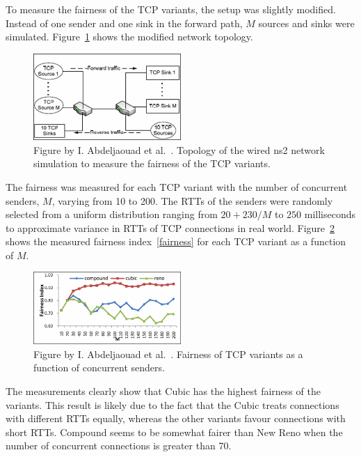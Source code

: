 To measure the fairness of the TCP variants, the setup was slightly modified. Instead of one sender and one sink in the forward path, $M$ sources and sinks were simulated. Figure~\ref{fig:topology2} shows the modified network topology.

\begin{figure}
	\includegraphics[width=0.5\textwidth]{images/abdeljaouad10_topology_2.png}
	\caption{Figure by I. Abdeljaouad et al.~\cite{Abdeljaouad10}. Topology of the wired ns2 network simulation to measure the fairness of the TCP variants.}
	\label{fig:topology2}
\end{figure}

The fairness was measured for each TCP variant with the number of concurrent senders, $M$, varying from 10 to 200. The RTTs of the senders were randomly selected from a uniform distribution ranging from $20 + 230/M$ to $250$ milliseconds to approximate variance in RTTs of TCP connections in real world. Figure~\ref{fig:fairness1} shows the measured fairness index~\eqref{fairness} for each TCP variant as a function of $M$.

\begin{figure}
	\includegraphics[width=0.5\textwidth]{images/abdeljaouad10_fairness_1.png}
	\caption{Figure by I. Abdeljaouad et al.~\cite{Abdeljaouad10}. Fairness of TCP variants as a function of concurrent senders.}
	\label{fig:fairness1}
\end{figure}

The measurements clearly show that Cubic has the highest fairness of the variants. This result is likely due to the fact that the Cubic treats connections with different RTTs equally, whereas the other variants favour connections with short RTTs. Compound seems to be somewhat fairer than New Reno when the number of concurrent connections is greater than 70. 

